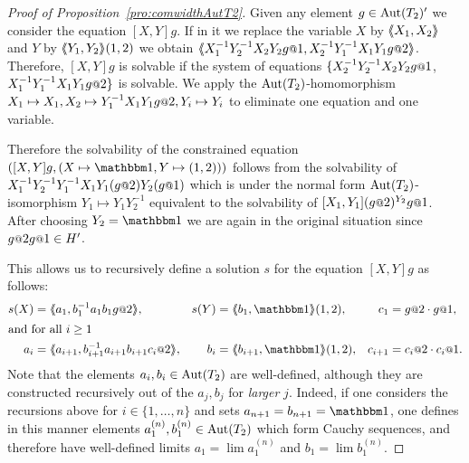 \documentclass[a4paper,11pt]{amsart}
\begin{document}
%  

\begin{proof}[Proof of Proposition~\ref{pro:comwidthAutT2}]
 Given any element $g\in \operatorname{{Aut}}(T_2)'$ we consider the equation $[X,Y]g$. 
 If in it we replace the variable $X$ by $\langle\negthickspace\langle X_1,X_2\rangle\negthickspace\rangle$ and $Y$ by $\langle\negthickspace\langle Y_1,Y_2\rangle\negthickspace\rangle(1,2)$ 
 we obtain $\pair{X_1^{-1}Y_2^{-1}X_2Y_2g\at{1},X_2^{-1}Y_1^{-1}X_1Y_1g\at{2}}$. 
 Therefore, $[X,Y]g$ is solvable if the system of equations
 $\{X_2^{-1}Y_2^{-1}X_2Y_2g\at{1}$, $X_1^{-1}Y_1^{-1}X_1Y_1g\at{2}\}$ is solvable.
 We apply the $\operatorname{{Aut}}(T_2)$-homomorphism $X_1\mapsto X_1,X_2\mapsto Y_1^{-1}X_1Y_1 g\at{2},Y_i\mapsto Y_i$ 
 to eliminate one equation and one variable.
 
 Therefore the solvability of the constrained equation
 $\left([X,Y]g, (X\mapsto\id,Y\mapsto (1,2)) \right)$ follows from the solvability of
 $X_1^{-1}Y_2^{-1}Y_1^{-1}X_1Y_1(g\at{2}) Y_2 (g\at{1})$ which is under the 
 normal form $\operatorname{{Aut}}(T_2)$-isomorphism $Y_1\mapsto Y_1Y_2^{-1}$ equivalent to the 
 solvability of $[X_1,Y_1](g\at{2})^{Y_2} g\at{1}$. After choosing $Y_2=\id$ we are 
 again in the original situation since $g\at{2} g\at{1}\in H'$. 
 
 This allows us to recursively define a solution $s$ for the equation $[X,Y]g$ as follows:
\begin{align*}
  s(X) &= \pair{a_1,b_1^{-1}a_1b_1 g\at{2} },
& s(Y) &= \pair{b_1,\id}(1,2), &c_1&=g\at{2} \cdot g\at{1}, \\
\intertext{and for all $i\geq 1$}
  a_{i} &= \pair{a_{i+1},b_{i+1}^{-1}a_{i+1}b_{i+1} c_i\at{2} }, & b_{i} &=\pair{b_{i+1},\id}(1,2),&c_{i+1}&=c_{i}\at{2} \cdot c_{i}\at{1}. 
 \end{align*}
 Note that the elements $a_i,b_i\in\operatorname{{Aut}}(T_2)$ are well-defined,
 although they are constructed recursively out of the $a_j,b_j$ for
 \emph{larger} $j$. Indeed, if one considers the recursions above for
 $i\in\{1,\dots,n\}$ and sets $a_{n+1}=b_{n+1}=\id$, one defines in
 this manner elements $a_1^{(n)},b_1^{(n)}\in\operatorname{{Aut}}(T_2)$ which form
 Cauchy sequences, and therefore have well-defined limits
 $a_1=\lim a_1^{(n)}$ and $b_1=\lim b_1^{(n)}$.
\end{proof}
\end{document}

